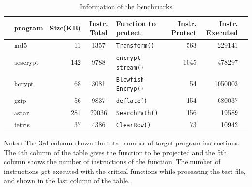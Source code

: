 \documentclass[preprint,12pt,3p]{elsarticle}
\begin{document}
\begin{table}[!t]
\scriptsize
\begin{center}
\caption{Information of the benchmarks\label{tab:Tab.3}}
{\begin{tabular}{@{}rlrclrrl@{}}
\toprule
   & \textbf{program} & \textbf{Size(KB)} & \textbf{Instr. Total} & \textbf{Function to protect} & \textbf{Instr. Protect} & \textbf{Instr. Executed} & \\
\midrule
   & md5 & 11 & 1357 & \texttt{Transform()} & 563 & 229141 & \\
   & aescrypt & 142 & 9788 &\texttt{encrypt-stream()} & 1045 & 478297 & \\
   & bcrypt & 68 & 3081 & \texttt{Blowfish-Encryp()} & 54 & 1050003 & \\
   & gzip & 56 & 9837 & \texttt{deflate()} & 154 & 680037 & \\
   & astar & 281 & 29036 & \texttt{SearchPath()} & 156 & 19589 & \\
   & tetris & 37 & 4386 & \texttt{ClearRow()} & 73 & 10942\\%
\bottomrule
\end{tabular}}{}
\end{center}
Notes: The 3rd column shown the total number of target program instructions. The 4th column of the table gives the function to be projected and the 5th column shows the number of instructions of the function. The number of instructions got executed with the critical functions while processing the test file, and shown in the last column of the table.
\end{table}
\end{document}
